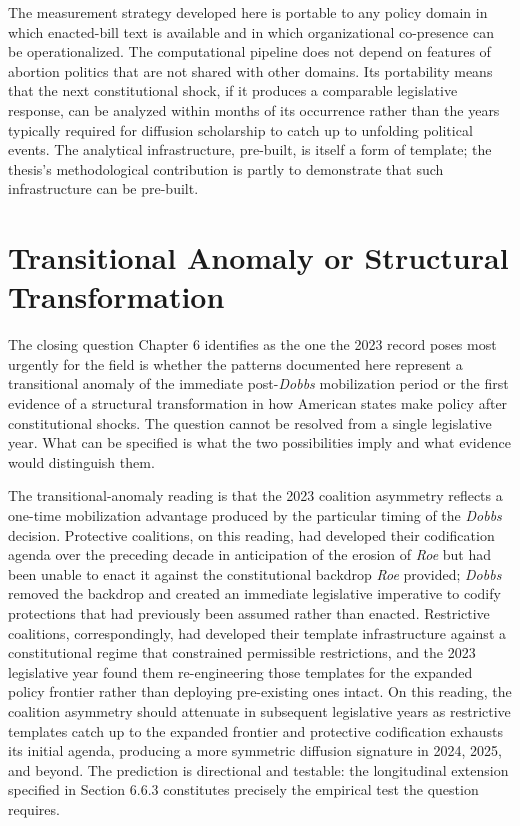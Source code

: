 The measurement strategy developed here is portable to any policy domain in which enacted-bill text is available and in which organizational co-presence can be operationalized. The computational pipeline does not depend on features of abortion politics that are not shared with other domains. Its portability means that the next constitutional shock, if it produces a comparable legislative response, can be analyzed within months of its occurrence rather than the years typically required for diffusion scholarship to catch up to unfolding political events. The analytical infrastructure, pre-built, is itself a form of template; the thesis's methodological contribution is partly to demonstrate that such infrastructure can be pre-built.
 
\section{Transitional Anomaly or Structural Transformation}
 
The closing question Chapter 6 identifies as the one the 2023 record poses most urgently for the field is whether the patterns documented here represent a transitional anomaly of the immediate post-\textit{Dobbs} mobilization period or the first evidence of a structural transformation in how American states make policy after constitutional shocks. The question cannot be resolved from a single legislative year. What can be specified is what the two possibilities imply and what evidence would distinguish them.
 
The transitional-anomaly reading is that the 2023 coalition asymmetry reflects a one-time mobilization advantage produced by the particular timing of the \textit{Dobbs} decision. Protective coalitions, on this reading, had developed their codification agenda over the preceding decade in anticipation of the erosion of \textit{Roe} but had been unable to enact it against the constitutional backdrop \textit{Roe} provided; \textit{Dobbs} removed the backdrop and created an immediate legislative imperative to codify protections that had previously been assumed rather than enacted. Restrictive coalitions, correspondingly, had developed their template infrastructure against a constitutional regime that constrained permissible restrictions, and the 2023 legislative year found them re-engineering those templates for the expanded policy frontier rather than deploying pre-existing ones intact. On this reading, the coalition asymmetry should attenuate in subsequent legislative years as restrictive templates catch up to the expanded frontier and protective codification exhausts its initial agenda, producing a more symmetric diffusion signature in 2024, 2025, and beyond. The prediction is directional and testable: the longitudinal extension specified in Section 6.6.3 constitutes precisely the empirical test the question requires.
 
